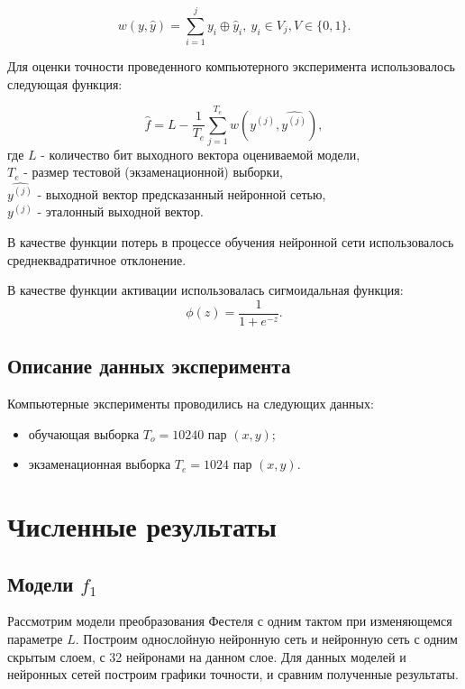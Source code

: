   \begin{equation}
  w(y, \hat{y}) = \sum_{i=1}^{j} y_i \oplus \hat{y}_i,\ y_i \in V_j, V \in \{0,1\}.
  \end{equation}
  \bigskip
  
  Для оценки точности проведенного компьютерного эксперимента использовалось следующая функция:
  
  \begin{equation}
  \hat{f} =L - \dfrac{1}{T_e}\sum_{j=1}^{T_e}w(y^{(j)}, \hat{y^{(j)}}),
  \end{equation}
  где $L$ - количество бит выходного вектора оцениваемой модели,\\
  $T_e$ - размер тестовой (экзаменационной) выборки,\\
  $\hat{y^{(j)}}$ - выходной вектор предсказанный нейронной сетью,\\
  $y^{(j)}$ - эталонный выходной вектор.
  
  \bigskip
  В качестве функции потерь в процессе обучения нейронной сети использовалось среднеквадратичное отклонение.
  
  \bigskip
  В качестве функции активации использовалась сигмоидальная функция:
  \begin{equation}
  \phi(z) = \frac{1}{1 + e ^{-z}}.
  \end{equation}
  
  \bigskip
  \newpage
  \subsection{Описание данных эксперимента}
  
  Компьютерные эксперименты проводились на следующих данных:
  \begin{itemize}
  		\item обучающая выборка $T_o=10240$ пар $(x, y)$;
  		\item экзаменационная выборка $T_e=1024$ пар $(x, y)$.
  \end{itemize}
  
  
  \newpage 
  \section{Численные результаты}
  \subsection{Модели $f_{1}$}
Рассмотрим модели преобразования Фестеля с одним тактом при изменяющемся параметре $L$.
Построим однослойную нейронную сеть и нейронную сеть с одним скрытым слоем, с 32 нейронами на данном слое.
Для данных моделей и нейронных сетей построим графики точности, и сравним полученные результаты.

